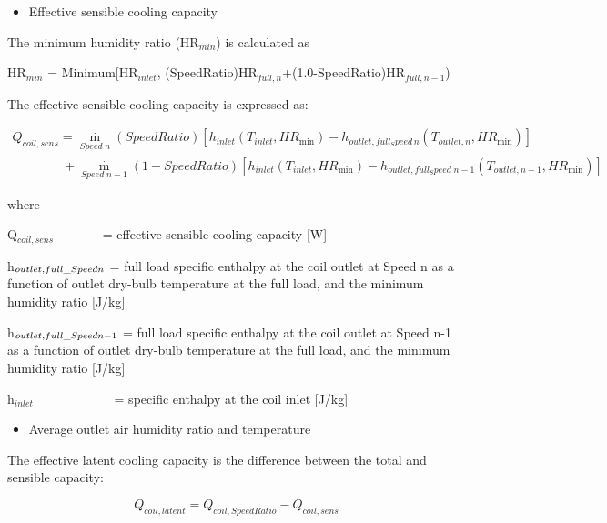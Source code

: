 \begin{itemize}
  \item Effective sensible cooling capacity
\end{itemize}

The minimum humidity ratio (HR\(_{min}\)) is calculated as

HR\(_{min}\) = Minimum{[}HR\(_{inlet}\), (SpeedRatio)HR\(_{full,n}\)+(1.0-SpeedRatio)HR\(_{full,n-1}\))

The effective sensible cooling capacity is expressed as:

\begin{equation}
\begin{array}{l}
{Q_{coil,sens}} = {\mathop m\limits^\cdot_{Speed\;n}}(SpeedRatio)[{h_{inlet}}({T_{inlet}},H{R_{\min }}) - {h_{outlet,full_Speed\,n}}({T_{outlet,n}},H{R_{\min }})] \\
\;\;\;\;\;\;\;\;\;\;\;\;\;\; + {\mathop m\limits^\cdot_{Speed\;n - 1}}(1 - SpeedRatio)[{h_{inlet}}({T_{inlet}},H{R_{\min }}) - {h_{outlet,full_Speed\;n - 1}}({T_{outlet,n - 1}},H{R_{\min }})]
\end{array}
\end{equation}

where

Q\(_{coil,sens}\)~~~~~~~ = effective sensible cooling capacity {[}W{]}

h\(_{outlet,full\_Speed\\ n}\) = full load specific enthalpy at the coil outlet at Speed n as a function of outlet dry-bulb temperature at the full load, and the minimum humidity ratio {[}J/kg{]}

h\(_{outlet,full\_Speed\\ n-1}\) = full load specific enthalpy at the coil outlet at Speed n-1 as a function of outlet dry-bulb temperature at the full load, and the minimum humidity ratio {[}J/kg{]}

h\(_{inlet}\)~~~~~~~~~~~~ = specific enthalpy at the coil inlet {[}J/kg{]}

\begin{itemize}
  \item Average outlet air humidity ratio and temperature
\end{itemize}

The effective latent cooling capacity is the difference between the total and sensible capacity:

\begin{equation}
{Q_{coil,latent}} = {Q_{coil,SpeedRatio}} - {Q_{coil,sens}}
\end{equation}

